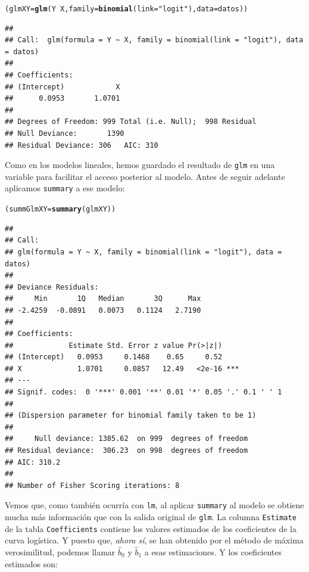 \documentclass[10pt,a4paper]{article}\usepackage[]{graphicx}\usepackage[]{color}
\makeatletter
\newcommand{\hlstr}[1]{\textcolor[rgb]{0.192,0.494,0.8}{#1}}%
\newcommand{\hlopt}[1]{\textcolor[rgb]{0,0,0}{#1}}%
\newcommand{\hlstd}[1]{\textcolor[rgb]{0.345,0.345,0.345}{#1}}%
\newcommand{\hlkwb}[1]{\textcolor[rgb]{0.69,0.353,0.396}{#1}}%
\newcommand{\hlkwc}[1]{\textcolor[rgb]{0.333,0.667,0.333}{#1}}%
\newcommand{\hlkwd}[1]{\textcolor[rgb]{0.737,0.353,0.396}{\textbf{#1}}}%
\newenvironment{kframe}{%
 \def\at@end@of@kframe{}%
 \ifinner\ifhmode%
  \def\at@end@of@kframe{\end{minipage}}%
  \begin{minipage}{\columnwidth}%
 \fi\fi%
 \def\FrameCommand##1{\hskip\@totalleftmargin \hskip-\fboxsep
 \colorbox{shadecolor}{##1}\hskip-\fboxsep
     \hskip-\linewidth \hskip-\@totalleftmargin \hskip\columnwidth}%
 \MakeFramed {\advance\hsize-\width
   \@totalleftmargin\z@ \linewidth\hsize
   \@setminipage}}%
 {\par\unskip\endMakeFramed%
 \at@end@of@kframe}
\newenvironment{knitrout}{}{} %
\newcounter {cont01}
\makeatother
\begin{document}
\begin{knitrout}
\color{fgcolor}\begin{kframe}
\begin{alltt}
\hlstd{(glmXY} \hlkwb{=} \hlkwd{glm}\hlstd{(Y} \hlopt{~} \hlstd{X,} \hlkwc{family} \hlstd{=} \hlkwd{binomial}\hlstd{(}\hlkwc{link} \hlstd{=} \hlstr{"logit"}\hlstd{),} \hlkwc{data} \hlstd{= datos))}
\end{alltt}
\begin{verbatim}
## 
## Call:  glm(formula = Y ~ X, family = binomial(link = "logit"), data = datos)
## 
## Coefficients:
## (Intercept)            X  
##      0.0953       1.0701  
## 
## Degrees of Freedom: 999 Total (i.e. Null);  998 Residual
## Null Deviance:	    1390 
## Residual Deviance: 306 	AIC: 310
\end{verbatim}
\end{kframe}
\end{knitrout}

Como en los modelos lineales, hemos guardado el resultado de {\tt glm} en una variable para facilitar el acceso posterior al modelo. Antes de seguir adelante aplicamos {\tt summary} a ese modelo:
\begin{knitrout}
\color{fgcolor}\begin{kframe}
\begin{alltt}
\hlstd{(summGlmXY} \hlkwb{=} \hlkwd{summary}\hlstd{(glmXY))}
\end{alltt}
\begin{verbatim}
## 
## Call:
## glm(formula = Y ~ X, family = binomial(link = "logit"), data = datos)
## 
## Deviance Residuals: 
##     Min       1Q   Median       3Q      Max  
## -2.4259  -0.0891   0.0073   0.1124   2.7190  
## 
## Coefficients:
##             Estimate Std. Error z value Pr(>|z|)    
## (Intercept)   0.0953     0.1468    0.65     0.52    
## X             1.0701     0.0857   12.49   <2e-16 ***
## ---
## Signif. codes:  0 '***' 0.001 '**' 0.01 '*' 0.05 '.' 0.1 ' ' 1
## 
## (Dispersion parameter for binomial family taken to be 1)
## 
##     Null deviance: 1385.62  on 999  degrees of freedom
## Residual deviance:  306.23  on 998  degrees of freedom
## AIC: 310.2
## 
## Number of Fisher Scoring iterations: 8
\end{verbatim}
\end{kframe}
\end{knitrout}
Vemos que, como también ocurría con {\tt lm}, al aplicar {\tt summary} al modelo se obtiene mucha más información que con la salida original de {\tt glm}.  La columna {\tt Estimate} de la tabla {\tt Coefficients} contiene los valores estimados de los coeficientes de la curva logística. Y puesto que, {\em ahora sí}, se han obtenido por el método de máxima verosimilitud, podemos llamar $\hat b_0$ y $\hat b_1$ a esas estimaciones.  Y los coeficientes estimados son:
\end{document}
